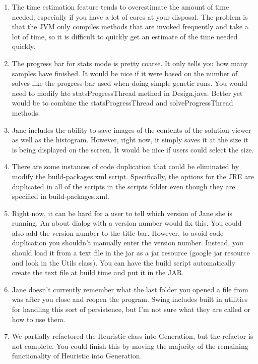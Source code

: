 \documentclass{article}
\begin{document}
\begin{enumerate}
\item The time estimation feature tends to overestimate the amount of time needed, especially if you have a lot of cores at your disposal. The problem is that the JVM only compiles methods that are invoked frequently and take a lot of time, so it is difficult to quickly get an estimate of the time needed quickly.

\item The progress bar for stats mode is pretty coarse. It only tells you how many samples have finished. It would be nice if it were based on the number of solves like the progress bar used when doing simple genetic runs. You would need to modify hte statsProgressThread method in Design.java. Better yet would be to combine the statsProgressThread and solveProgressThread methods.

\item Jane includes the ability to save images of the contents of the solution viewer as well as the histogram. However, right now, it simply saves it at the size it is being displayed on the screen. It would be nice if users could select the size.

\item There are some instances of code duplication that could be eliminated by modify the build-packages.xml script. Specifically, the options for the JRE are duplicated in all of the scripts in the scripts folder even though they are specified in build-packages.xml.

\item Right now, it can be hard for a user to tell which version of Jane she is running. An about dialog with a version number would fix this. You could also add the version number to the title bar. However, to avoid code duplication you shouldn't manually enter the version number. Instead, you should load it from a text file in the jar as a jar resource (google jar resource and look in the Utils class). You can have the build script automatically create the text file at build time and put it in the JAR.

\item Jane doesn't currently remember what the last folder you opened a file from was after you close and reopen the program. Swing includes built in utilities for handling this sort of persistence, but I'm not sure what they are called or how to use them.

\item We partially refactored the Heuristic class into Generation, but the refactor is not complete. You could finish this by moving the majority of the remaining functionality of Heuristic into Generation.


\end{enumerate}
\end{document}
